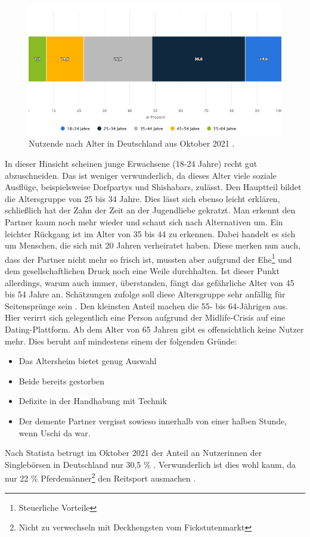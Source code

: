 \begin{figure}[h]
    \centering
    \includegraphics[scale=0.65]{Sources/alter.png}
    \caption{Nutzende nach Alter in Deutschland aus Oktober 2021 \cite{statista}.}
    \label{fig:analyse-alter}
\end{figure}

In dieser Hinsicht scheinen junge Erwachsene (18-24 Jahre) recht gut abzuschneiden.
Das ist weniger verwunderlich, da dieses Alter viele soziale Ausflüge, beispielsweise Dorfpartys und Shishabars, zulässt.
Den Hauptteil bildet die Altersgruppe von 25 bis 34 Jahre.
Dies lässt sich ebenso leicht erklären, schließlich hat der Zahn der Zeit an der Jugendliebe gekratzt.
Man erkennt den Partner kaum noch mehr wieder und schaut sich nach Alternativen um.
Ein leichter Rückgang ist im Alter von 35 bis 44 zu erkennen.
Dabei handelt es sich um Menschen, die sich mit 20 Jahren verheiratet haben.
Diese merken nun auch, dass der Partner nicht mehr so frisch ist, mussten aber aufgrund der Ehe\footnote{Steuerliche Vorteile} und dem gesellschaftlichen Druck noch eine Weile durchhalten.
Ist dieser Punkt allerdings, warum auch immer, überstanden, fängt das gefährliche Alter von 45 bis 54 Jahre an.
Schätzungen zufolge soll diese Altersgruppe sehr anfällig für Seitensprünge sein \cite{seitensprung}.
Den kleinsten Anteil machen die 55- bis 64-Jährigen aus.
Hier verirrt sich gelegentlich eine Person aufgrund der Midlife-Crisis auf eine Dating-Plattform.
Ab dem Alter von 65 Jahren gibt es offensichtlich keine Nutzer mehr.
Dies beruht auf mindestens einem der folgenden Gründe:
\begin{itemize}
    \item Das Altersheim bietet genug Auswahl
    \item Beide bereits gestorben
    \item Defizite in der Handhabung mit Technik
    \item Der demente Partner vergisst sowieso innerhalb von einer halben Stunde, wenn Uschi da war.
\end{itemize} 
Nach Statista betrugt im Oktober 2021 der Anteil an Nutzerinnen der Singlebörsen in Deutschland nur 30,5 \% \cite{statista}.
Verwunderlich ist dies wohl kaum, da nur 22 \% Pferdemänner\footnote{Nicht zu verwechseln mit Deckhengsten vom Fickstutenmarkt} den Reitsport ausmachen \cite{bliemel}.

